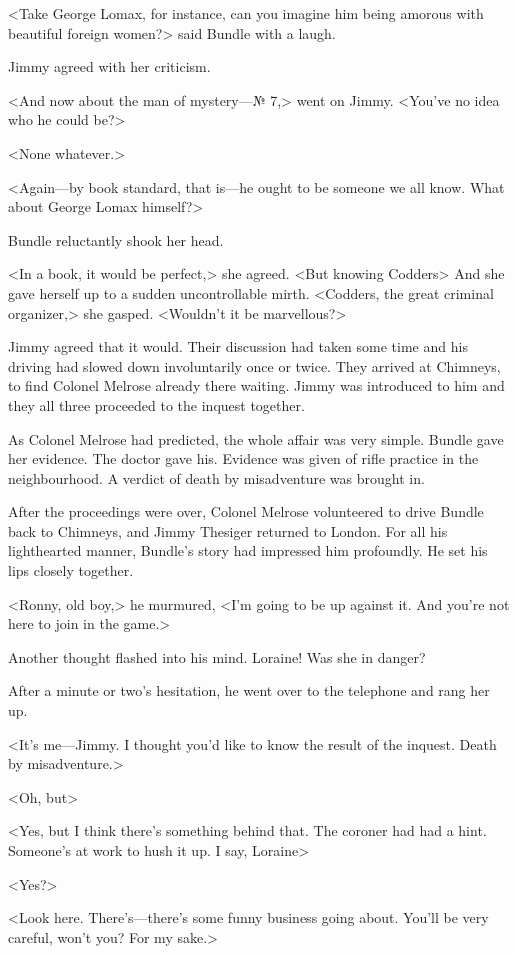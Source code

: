 <Take George Lomax, for instance, can you imagine him being amorous with beautiful foreign women?> said Bundle with a laugh.

Jimmy agreed with her criticism.

<And now about the man of mystery—№ 7,> went on Jimmy. <You've no idea who he could be?>

<None whatever.>

<Again—by book standard, that is—he ought to be someone we all know. What about George Lomax himself?>

Bundle reluctantly shook her head.

<In a book, it would be perfect,> she agreed. <But knowing Codders\longdash> And she gave herself up to a sudden uncontrollable mirth. <Codders, the great criminal organizer,> she gasped. <Wouldn't it be marvellous?>

Jimmy agreed that it would. Their discussion had taken some time and his driving had slowed down involuntarily once or twice. They arrived at Chimneys, to find Colonel Melrose already there waiting. Jimmy was introduced to him and they all three proceeded to the inquest together.

As Colonel Melrose had predicted, the whole affair was very simple. Bundle gave her evidence. The doctor gave his. Evidence was given of rifle practice in the neighbourhood. A verdict of death by misadventure was brought in.

After the proceedings were over, Colonel Melrose volunteered to drive Bundle back to Chimneys, and Jimmy Thesiger returned to London. For all his lighthearted manner, Bundle's story had impressed him profoundly. He set his lips closely together.

<Ronny, old boy,> he murmured, <I'm going to be up against it. And you're not here to join in the game.>

Another thought flashed into his mind. Loraine! Was she in danger?

After a minute or two's hesitation, he went over to the telephone and rang her up.

<It's me—Jimmy. I thought you'd like to know the result of the inquest. Death by misadventure.>

<Oh, but\longdash>

<Yes, but I think there's something behind that. The coroner had had a hint. Someone's at work to hush it up. I say, Loraine\longdash>

<Yes?>

<Look here. There's—there's some funny business going about. You'll be very careful, won't you? For my sake.>

